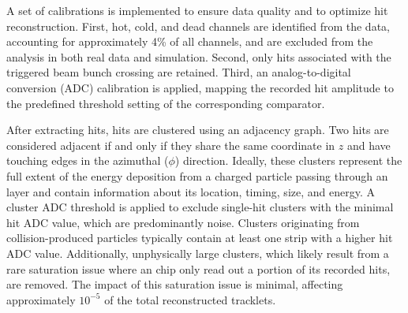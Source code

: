 A set of \intt calibrations is implemented to ensure data quality and to optimize hit reconstruction.
First, hot, cold, and dead channels are identified from the data, accounting for approximately 4\% of all \intt channels, and are excluded from the analysis in both real data and simulation. Second, only hits associated with the triggered beam bunch crossing are retained. Third, an analog-to-digital conversion (ADC) calibration is applied, mapping the recorded \intt hit amplitude to the predefined threshold setting of the corresponding comparator.

After extracting \intt hits, hits are clustered using an adjacency graph. Two \intt hits are considered adjacent if and only if they share the same coordinate in $z$ and have touching edges in the azimuthal ($\phi$) direction. Ideally, these clusters represent the full extent of the energy deposition from a charged particle passing through an \intt layer and contain information about its location, timing, size, and energy. A cluster ADC threshold is applied to exclude single-hit clusters with the minimal hit ADC value, which are predominantly noise. Clusters originating from collision-produced particles typically contain at least one strip with a higher hit ADC value. Additionally, unphysically large clusters, which likely result from a rare saturation issue where an \intt chip only read out a portion of its recorded hits, are removed. The impact of this saturation issue is minimal, affecting approximately $10^{-5}$ of the total reconstructed tracklets.

